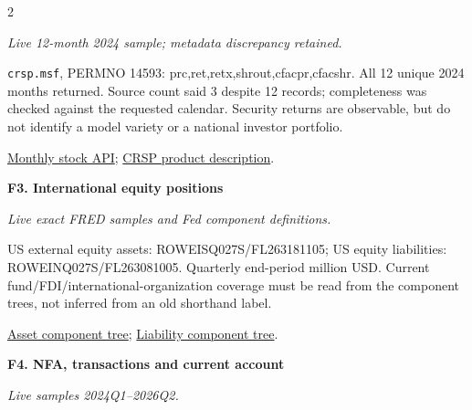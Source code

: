 \documentclass[10pt,a4paper,landscape]{article}
\newcommand{\code}[1]{{\footnotesize\texttt{#1}}}
\begin{document}
\begin{multicols}{2}
\begin{minipage}{\linewidth}
{\footnotesize\itshape Live 12-month 2024 sample; metadata discrepancy retained.}\par

\code{crsp.msf}, PERMNO 14593: prc,ret,retx,shrout,cfacpr,cfacshr. All 12 unique 2024 months returned. Source count said 3 despite 12 records; completeness was checked against the requested calendar. Security returns are observable, but do not identify a model variety or a national investor portfolio.

\par \href{https://wrds-api.wharton.upenn.edu/data/crsp.msf/}{Monthly stock API}; \href{https://www.crsp.org/research__trashed/crsp-us-stock-databases/}{CRSP product description}.

\end{minipage}\par\vspace{6pt}

\noindent\begin{minipage}{\linewidth}\raggedright

\hypertarget{src-F3}{\textbf{F3. International equity positions}}\par

{\footnotesize\itshape Live exact FRED samples and Fed component definitions.}\par

US external equity assets: ROWEISQ027S/FL263181105; US equity liabilities: ROWEINQ027S/FL263081005. Quarterly end-period million USD. Current fund/FDI/international-organization coverage must be read from the component trees, not inferred from an old shorthand label.

\par \href{https://www.federalreserve.gov/apps/fof/SeriesAnalyzer.aspx?s=FL263181105&t=}{Asset component tree}; \href{https://www.federalreserve.gov/apps/fof/SeriesAnalyzer.aspx?s=FL263081005&t=}{Liability component tree}.

\end{minipage}\par\vspace{6pt}

\noindent\begin{minipage}{\linewidth}\raggedright

\hypertarget{src-F4}{\textbf{F4. NFA, transactions and current account}}\par

{\footnotesize\itshape Live samples 2024Q1--2026Q2.}\par


\end{minipage}
\end{multicols}
\end{document}
